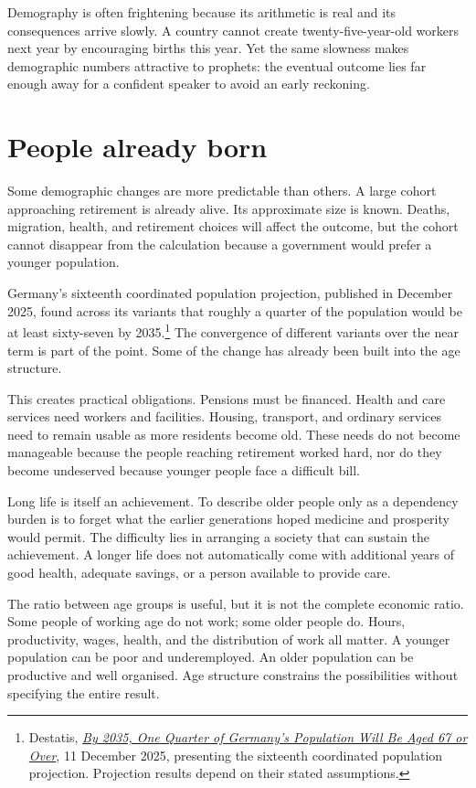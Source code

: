 \documentclass[12pt,a4paper]{book}
\begin{document}
Demography is often frightening because its arithmetic is real and its consequences arrive slowly. A country cannot create twenty-five-year-old workers next year by encouraging births this year. Yet the same slowness makes demographic numbers attractive to prophets: the eventual outcome lies far enough away for a confident speaker to avoid an early reckoning.

\section*{People already born}

Some demographic changes are more predictable than others. A large cohort approaching retirement is already alive. Its approximate size is known. Deaths, migration, health, and retirement choices will affect the outcome, but the cohort cannot disappear from the calculation because a government would prefer a younger population.

Germany's sixteenth coordinated population projection, published in December 2025, found across its variants that roughly a quarter of the population would be at least sixty-seven by 2035.\footnote{Destatis, \href{https://www.destatis.de/EN/Press/2025/12/PE25_446_12.html}{\emph{By 2035, One Quarter of Germany's Population Will Be Aged 67 or Over}}, 11 December 2025, presenting the sixteenth coordinated population projection. Projection results depend on their stated assumptions.} The convergence of different variants over the near term is part of the point. Some of the change has already been built into the age structure.

This creates practical obligations. Pensions must be financed. Health and care services need workers and facilities. Housing, transport, and ordinary services need to remain usable as more residents become old. These needs do not become manageable because the people reaching retirement worked hard, nor do they become undeserved because younger people face a difficult bill.

Long life is itself an achievement. To describe older people only as a dependency burden is to forget what the earlier generations hoped medicine and prosperity would permit. The difficulty lies in arranging a society that can sustain the achievement. A longer life does not automatically come with additional years of good health, adequate savings, or a person available to provide care.

The ratio between age groups is useful, but it is not the complete economic ratio. Some people of working age do not work; some older people do. Hours, productivity, wages, health, and the distribution of work all matter. A younger population can be poor and underemployed. An older population can be productive and well organised. Age structure constrains the possibilities without specifying the entire result.
\end{document}
